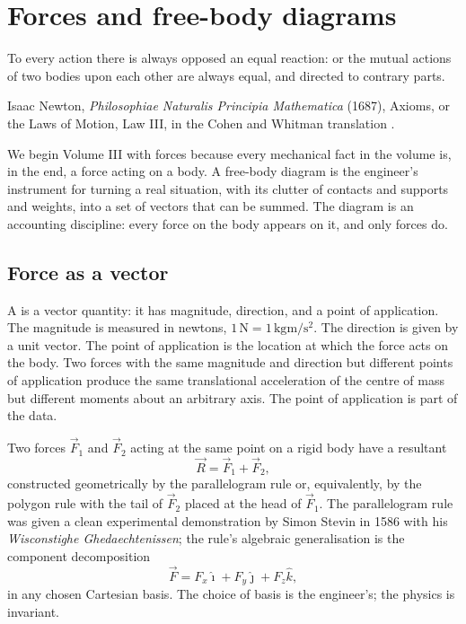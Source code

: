 \chapter{Forces and free-body diagrams}
\label{vol03:ch01}

\epigraph{To every action there is always opposed an equal reaction: or
the mutual actions of two bodies upon each other are always equal, and
directed to contrary parts.}{Isaac Newton, \emph{Philosophiae Naturalis
Principia Mathematica} (1687), Axioms, or the Laws of Motion, Law III,
in the Cohen and Whitman translation \cite[p.~417]{hist:newton1687}.}


\noindent
We begin Volume III with forces because every mechanical fact in the
volume is, in the end, a force acting on a body. A free-body diagram is
the engineer's instrument for turning a real situation, with its
clutter of contacts and supports and weights, into a set of vectors
that can be summed. The diagram is an accounting discipline: every force on the body
appears on it, and only forces do.

\section{Force as a vector}

A  is a vector quantity: it has magnitude, direction,
and a point of application. The magnitude is measured in newtons,
$1\,\si{\newton} = 1\,\si{\kilogram\meter\per\second\squared}$. The
direction is given by a unit vector. The point of application is the
location at which the force acts on the body. Two forces with the same
magnitude and direction but different points of application produce the
same translational acceleration of the centre of mass but different
moments about an arbitrary axis. The point of application is part of
the data.

Two forces $\vec{F}_1$ and $\vec{F}_2$ acting at the same point on a
rigid body have a resultant
\[
\vec{R} = \vec{F}_1 + \vec{F}_2,
\]
constructed geometrically by the parallelogram rule or, equivalently,
by the polygon rule with the tail of $\vec{F}_2$ placed at the head of
$\vec{F}_1$. The parallelogram rule was given a clean experimental
demonstration by Simon Stevin in 1586 with his \emph{Wisconstighe
Ghedaechtenissen}; the rule's algebraic generalisation is the
component decomposition
\[
\vec{F} = F_x \hat{\imath} + F_y \hat{\jmath} + F_z \hat{k},
\]
in any chosen Cartesian basis. The choice of basis is the engineer's;
the physics is invariant.

